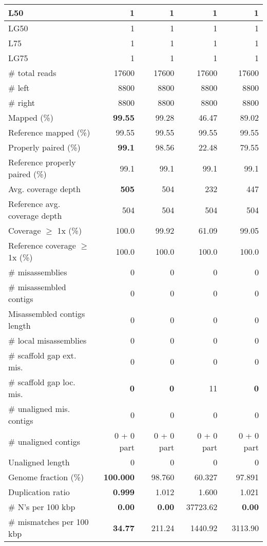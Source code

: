 \documentclass[12pt,a4paper]{article}
\begin{document}
\begin{table}[ht]
\begin{center}
\begin{tabular}{|l*{4}{|r}|}
L50 & 1 & 1 & 1 & 1 \\ \hline
LG50 & 1 & 1 & 1 & 1 \\ \hline
L75 & 1 & 1 & 1 & 1 \\ \hline
LG75 & 1 & 1 & 1 & 1 \\ \hline
\# total reads & 17600 & 17600 & 17600 & 17600 \\ \hline
\# left & 8800 & 8800 & 8800 & 8800 \\ \hline
\# right & 8800 & 8800 & 8800 & 8800 \\ \hline
Mapped (\%) & {\bf 99.55} & 99.28 & 46.47 & 89.02 \\ \hline
Reference mapped (\%) & 99.55 & 99.55 & 99.55 & 99.55 \\ \hline
Properly paired (\%) & {\bf 99.1} & 98.56 & 22.48 & 79.55 \\ \hline
Reference properly paired (\%) & 99.1 & 99.1 & 99.1 & 99.1 \\ \hline
Avg. coverage depth & {\bf 505} & 504 & 232 & 447 \\ \hline
Reference avg. coverage depth & 504 & 504 & 504 & 504 \\ \hline
Coverage $\geq$ 1x (\%) & 100.0 & 99.92 & 61.09 & 99.05 \\ \hline
Reference coverage $\geq$ 1x (\%) & 100.0 & 100.0 & 100.0 & 100.0 \\ \hline
\# misassemblies & 0 & 0 & 0 & 0 \\ \hline
\# misassembled contigs & 0 & 0 & 0 & 0 \\ \hline
Misassembled contigs length & 0 & 0 & 0 & 0 \\ \hline
\# local misassemblies & 0 & 0 & 0 & 0 \\ \hline
\# scaffold gap ext. mis. & 0 & 0 & 0 & 0 \\ \hline
\# scaffold gap loc. mis. & {\bf 0} & {\bf 0} & 11 & {\bf 0} \\ \hline
\# unaligned mis. contigs & 0 & 0 & 0 & 0 \\ \hline
\# unaligned contigs & 0 + 0 part & 0 + 0 part & 0 + 0 part & 0 + 0 part \\ \hline
Unaligned length & 0 & 0 & 0 & 0 \\ \hline
Genome fraction (\%) & {\bf 100.000} & 98.760 & 60.327 & 97.891 \\ \hline
Duplication ratio & {\bf 0.999} & 1.012 & 1.600 & 1.021 \\ \hline
\# N's per 100 kbp & {\bf 0.00} & {\bf 0.00} & 37723.62 & {\bf 0.00} \\ \hline
\# mismatches per 100 kbp & {\bf 34.77} & 211.24 & 1440.92 & 3113.90 \\ \hline

\end{tabular}
\end{center}
\end{table}
\end{document}
